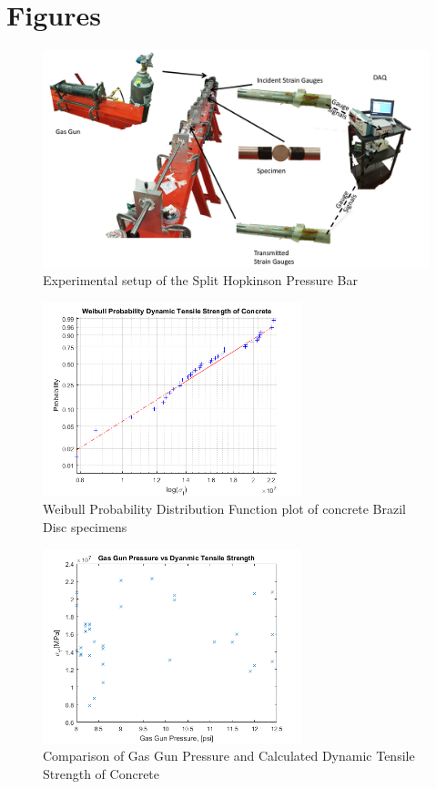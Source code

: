 \documentclass[12pt]{article}
\begin{document}
\section{Figures}
\begin{figure}[H]
	\centering
	\includegraphics[width=1\textwidth]{TestSetUp.png}
	\caption{Experimental setup of the Split Hopkinson Pressure Bar}
	\label{fig:TestSetup}
\end{figure}

\begin{figure}[H]
	\centering
	\includegraphics[width=0.67\textwidth]{Weibull.png}
	\caption{Weibull Probability Distribution Function plot of concrete Brazil Disc specimens}
	\label{fig:Weibull}
\end{figure}

\begin{figure}[H]
	\centering
	\includegraphics[width=0.67\textwidth]{Pressure_TensileStrength.png}
	\caption{Comparison of Gas Gun Pressure and Calculated Dynamic Tensile Strength of Concrete}
	\label{fig:GasGun}
\end{figure}
\end{document}
